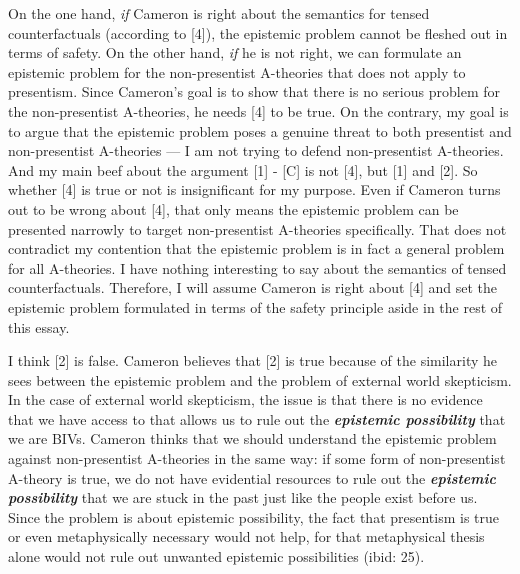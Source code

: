 \documentclass[a4paper,12pt]{article}
\begin{document}
On the one hand, \emph{if} Cameron is right about the semantics for tensed counterfactuals (according to [4]), the epistemic problem cannot be fleshed out in terms of safety. On the other hand, \emph{if} he is not right, we can formulate an epistemic problem for the non-presentist A-theories that does not apply to presentism. Since Cameron's goal is to show that there is no serious problem for the non-presentist A-theories, he needs [4] to be true. On the contrary, my goal is to argue that the epistemic problem poses a genuine threat to both presentist and non-presentist A-theories --- I am not trying to defend non-presentist A-theories. And my main beef about the argument [1] - [C] is not [4], but [1] and [2]. So whether [4] is true or not is insignificant for my purpose. Even if Cameron turns out to be wrong about [4], that only means the epistemic problem can be presented narrowly to target non-presentist A-theories specifically. That does not contradict my contention that the epistemic problem is in fact a general problem for all A-theories. I have nothing interesting to say about the semantics of tensed counterfactuals. Therefore, I will assume Cameron is right about [4] and set the epistemic problem formulated in terms of the safety principle aside in the rest of this essay.

I think [2] is false. Cameron believes that [2] is true because of the similarity he sees between the epistemic problem and the problem of external world skepticism. In the case of external world skepticism, the issue is that there is no evidence that we have access to that allows us to rule out the \emph{\textbf{epistemic possibility}} that we are BIVs. Cameron thinks that we should understand the epistemic problem against non-presentist A-theories in the same way: if some form of non-presentist A-theory is true, we do not have evidential resources to rule out the \emph{\textbf{epistemic possibility}} that we are stuck in the past just like the people exist before us. Since the problem is about epistemic possibility, the fact that presentism is true or even metaphysically necessary would not help, for that metaphysical thesis alone would not rule out unwanted epistemic possibilities (ibid: 25).
\end{document}
